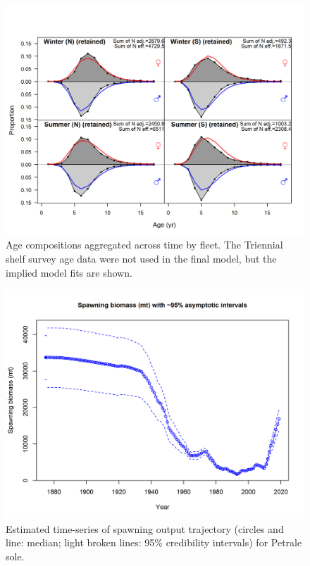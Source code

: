 \documentclass[12pt,]{article}
\begin{document}
\FloatBarrier

\begin{figure}
\centering
\includegraphics{r4ss/plots_mod1/comp_agefit__aggregated_across_time.png}
\caption{Age compositions aggregated across time by fleet. The Triennial
shelf survey age data were not used in the final model, but the implied
model fits are shown. \label{fig:age_agg}}
\end{figure}

\FloatBarrier

\begin{figure}
\centering
\includegraphics{r4ss/plots_mod1/ts7_Spawning_biomass_(mt)_with_95_asymptotic_intervals_intervals}
\caption{Estimated time-series of spawning output trajectory (circles
and line: median; light broken lines: 95\% credibility intervals) for
Petrale sole. \label{fig:ssb}}
\end{figure}
\end{document}
